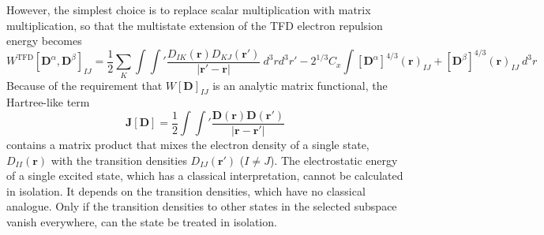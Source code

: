 \documentclass[journal=jpclcd,manuscript=letter]{achemso}
\newcommand\m[1]{\mathbf{#1}}
\renewcommand\vec[1]{\mathbf{#1}}
\begin{document}
However, the simplest choice is to replace scalar multiplication with matrix multiplication, so that the multistate extension
of the TFD electron repulsion energy becomes
\begin{equation}
W^{\text{TFD}}[\m{D}^{\alpha},\m{D}^{\beta}]_{IJ} = 
\frac{1}{2} \sum_{K} \int \int' \frac{D_{IK}(\vec{r}) D_{KJ}(\vec{r}')}{\vert \vec{r}' - \vec{r} \vert} ~ d^3r d^3r'
- 2^{1/3} C_x \int [\m{D}^{\alpha}]^{4/3}(\vec{r})_{IJ} + [\m{D}^{\beta}]^{4/3}(\vec{r})_{IJ} ~ d^3r
\end{equation}
Because of the requirement that $W[\m{D}]_{IJ}$ is an analytic matrix functional, the Hartree-like term 
\begin{equation}
\m{J}[\m{D}] = \frac{1}{2} \int \int' \frac{\m{D}(\vec{r}) \m{D}(\vec{r}')}{\vert \vec{r} - \vec{r}' \vert} \label{eqn:Hartree_term}
\end{equation}
contains a matrix product that mixes the electron density of a single state,
$D_{II}(\vec{r})$ with the transition densities $D_{IJ}(\vec{r}')$ ($I \neq J$).
The electrostatic energy of a single excited state, which has a classical interpretation, cannot be calculated in
isolation. It depends on the transition densities, which have no classical analogue.
Only if the transition densities to other states in the selected subspace vanish everywhere, can the state be
treated in isolation. 
\end{document}
